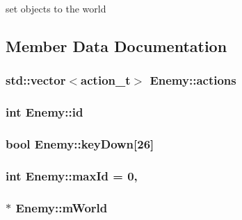 set objects to the world 



\subsection{Member Data Documentation}
\hypertarget{classEnemy_ab312d7e8255fc25eb014f8521c90337a}{}
\subsubsection[{actions}]{\setlength{\rightskip}{0pt plus 5cm}std\+::vector$<${\bf action\+\_\+t}$>$ Enemy\+::actions\hspace{0.3cm}{\ttfamily [private]}}\label{classEnemy_ab312d7e8255fc25eb014f8521c90337a}
\hypertarget{classEnemy_a70490642cc6e18ad3d0284dfa1930af3}{}
\subsubsection[{id}]{\setlength{\rightskip}{0pt plus 5cm}int Enemy\+::id\hspace{0.3cm}{\ttfamily [private]}}\label{classEnemy_a70490642cc6e18ad3d0284dfa1930af3}
\hypertarget{classEnemy_a911eb7364cbcb26ba06a80d8e4a3e8d9}{}
\subsubsection[{key\+Down}]{\setlength{\rightskip}{0pt plus 5cm}bool Enemy\+::key\+Down\mbox{[}26\mbox{]}\hspace{0.3cm}{\ttfamily [private]}}\label{classEnemy_a911eb7364cbcb26ba06a80d8e4a3e8d9}
\hypertarget{classEnemy_a09b21945c24e7a6226fa9f61335a73b4}{}
\subsubsection[{max\+Id}]{\setlength{\rightskip}{0pt plus 5cm}int Enemy\+::max\+Id = 0\hspace{0.3cm}{\ttfamily [static]}, {\ttfamily [private]}}\label{classEnemy_a09b21945c24e7a6226fa9f61335a73b4}
\hypertarget{classEnemy_a69922fd990ef2486fda1fd3e85d3feea}{}
\subsubsection[{m\+World}]{$\ast$ Enemy\+::m\+World\hspace{0.3cm}{\ttfamily [private]}}\label{classEnemy_a69922fd990ef2486fda1fd3e85d3feea}
\hypertarget{classEnemy_a787010c7b6adf5f5e9bd1247481a4317}{}
